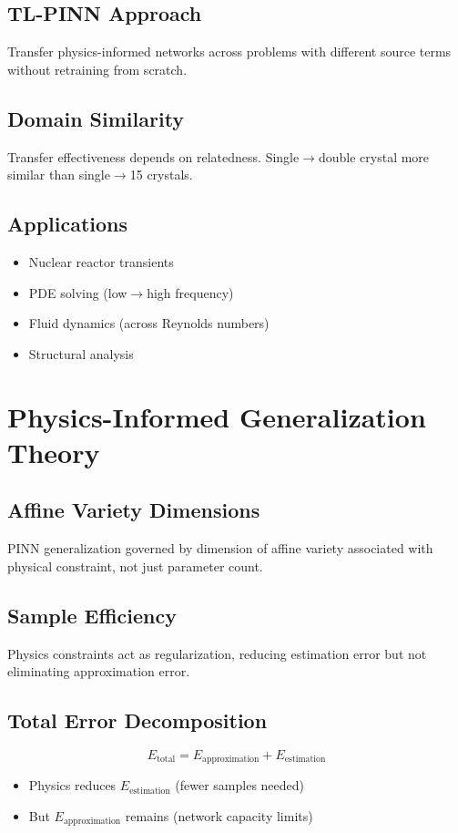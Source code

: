 \subsection{TL-PINN Approach}
Transfer physics-informed networks across problems with different source terms without retraining from scratch.

\subsection{Domain Similarity}
Transfer effectiveness depends on relatedness. Single$\rightarrow$double crystal more similar than single$\rightarrow$15 crystals.

\subsection{Applications}
\begin{itemize}
    \item Nuclear reactor transients
    \item PDE solving (low$\rightarrow$high frequency)
    \item Fluid dynamics (across Reynolds numbers)
    \item Structural analysis
\end{itemize}

\section{Physics-Informed Generalization Theory}

\subsection{Affine Variety Dimensions}
PINN generalization governed by dimension of affine variety associated with physical constraint, not just parameter count.

\subsection{Sample Efficiency}
Physics constraints act as regularization, reducing estimation error but not eliminating approximation error.

\subsection{Total Error Decomposition}
\begin{equation}
E_{\text{total}} = E_{\text{approximation}} + E_{\text{estimation}}
\end{equation}
\begin{itemize}
    \item Physics reduces $E_{\text{estimation}}$ (fewer samples needed)
    \item But $E_{\text{approximation}}$ remains (network capacity limits)
\end{itemize}

